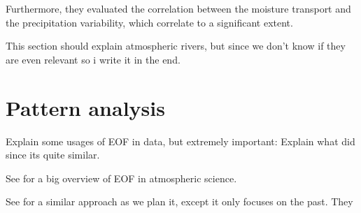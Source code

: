 

Furthermore, they evaluated the correlation between the moisture transport and the precipitation variability, which correlate to a significant extent.



This section should explain atmospheric rivers, but since we don't know if they are even relevant so i write it in the end. 

\section{Pattern analysis}

Explain some usages of EOF in data, but extremely important: Explain what \cite{ayantobo_integrated_2022} did since its quite similar. 


See \cite{hannachi_empirical_2007} for a big overview of EOF in atmospheric science.

See \cite{ayantobo_integrated_2022} for a similar approach as we plan it, except it only focuses on the past.
They 
